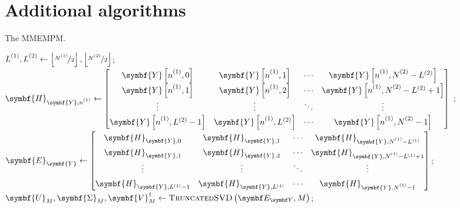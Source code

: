 \section{Additional algorithms}

\begin{algorithm}
    \caption{The \acs{MMEMPM}.}
    \label{alg:mmempm}
    \begin{algorithmic}[1]
        \State $\Lone, \Ltwo \gets \left\lfloor \nicefrac{\None}{2} \right\rfloor, \left\lfloor \nicefrac{\Ntwo}{2} \right\rfloor$;
            \State  $\symbf{H}_{\symbf{Y},\none} \gets
                \def\arraystretch{1.4}
            \begin{bmatrix}
                \symbf{Y}\left[\none, 0\right] &
                \symbf{Y}\left[\none, 1\right] &
                \cdots &
                \symbf{Y}\left[\none, \Ntwo-L^{(2)}\right]\\
                \symbf{Y}\left[\none, 1\right] &
                \symbf{Y}\left[\none, 2\right] &
                \cdots &
                \symbf{Y}\left[\none, \Ntwo-L^{(2)}+1\right]\\
                \vdots & \vdots & \ddots & \vdots\\
                \symbf{Y}\left[\none, L^{(2)} - 1\right] &
                \symbf{Y}\left[\none, L^{(2)}\right] &
                \cdots &
                \symbf{Y}\left[\none, \Ntwo-1\right]\\
            \end{bmatrix}
        $
        \EndFor;
        \State $\symbf{E}_{\symbf{Y}} \gets
        \begin{bmatrix}
            \symbf{H}_{\symbf{Y},0} & \symbf{H}_{\symbf{Y},1} & \cdots & \symbf{H}_{\symbf{Y},\None - L^{(1)}}\\
            \symbf{H}_{\symbf{Y},1} & \symbf{H}_{\symbf{Y},2} & \cdots & \symbf{H}_{\symbf{Y},\None - L^{(1)} + 1}\\
            \vdots & \vdots & \ddots & \vdots\\
            \symbf{H}_{\symbf{Y},L^{(1)} - 1} & \symbf{H}_{\symbf{Y},L^{(1)}} & \cdots & \symbf{H}_{\symbf{Y},\None - 1}
        \end{bmatrix}
        $;
        \State $\symbf{U}_M^{\vphantom{\dagger}},
            \symbf{\Sigma}_M^{\vphantom{\dagger}},
            \symbf{V}_M^{\dagger} \gets
            \textsc{TruncatedSVD}\left(\EY, M\right)$;

\end{algorithmic}
\end{algorithm}
